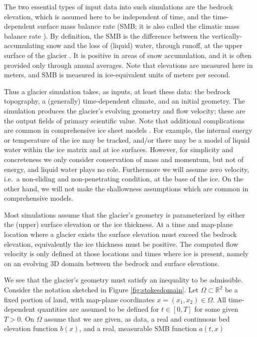 \documentclass[hidelinks,onefignum,onetabnum,final]{siamart220329}  %
\newcommand{\RR}{\mathbb{R}}
\begin{document}
The two essential types of input data into such simulations are the bedrock elevation, which is assumed here to be independent of time, and the time-dependent surface mass balance rate (SMB; it is also called the climatic mass balance rate \cite{Cogleyetal2011}).  By definition, the SMB is the difference between the vertically-accumulating snow and the loss of (liquid) water, through runoff, at the upper surface of the glacier \cite{Cogleyetal2011}.  It is positive in areas of snow accumulation, and it is often provided only through annual averages.  Note that elevations are measured here in meters, and SMB is measured in ice-equivalent units of meters per second.

Thus a glacier simulation takes, as inputs, at least these data: the bedrock topography, a (generally) time-dependent climate, and an initial geometry.  The simulation produces the glacier's evolving geometry and flow velocity; these are the output fields of primary scientific value.  Note that additional complications are common in comprehensive ice sheet models \cite{SchoofHewitt2013,Winkelmannetal2011}.  For example, the internal energy \cite{Aschwandenetal2012} or temperature of the ice may be tracked, and/or there may be a model of liquid water within the ice matrix and at ice surfaces.  However, for simplicity and concreteness we only consider conservation of mass and momentum, but not of energy, and liquid water plays no role.  Furthermore we will assume zero velocity, i.e.~a non-sliding and non-penetrating condition, at the base of the ice.  On the other hand, we will not make the shallowness assumptions which are common in comprehensive models.

Most simulations assume that the glacier's geometry is parameterized by either the (upper) surface elevation or the ice thickness.  At a time and map-plane location where a glacier exists the surface elevation must exceed the bedrock elevation, equivalently the ice thickness must be positive.  The computed flow velocity is only defined at those locations and times where ice is present, namely on an evolving 3D domain between the bedrock and surface elevations.

We see that the glacier's geometry must satisfy an inequality to be admissible.  Consider the notation sketched in Figure \ref{fig:stokesdomain}.  Let $\Omega \subset \RR^2$ be a fixed portion of land, with map-plane coordinates $x=(x_1,x_2)\in\Omega$.  All time-dependent quantities are assumed to be defined for $t\in [0,T]$ for some given $T>0$.  On $\Omega$ assume that we are given, as data, a real and continuous bed elevation function $b(x)$, and a real, measurable SMB function $a(t,x)$
\end{document}
